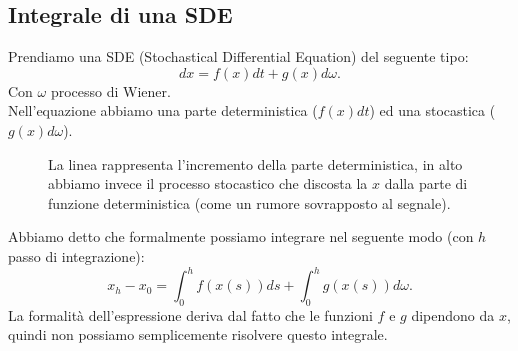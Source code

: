 \subsection{Integrale di una SDE}%
\label{sub:Integrale di una SDE}
Prendiamo una SDE (Stochastical Differential Equation) del seguente tipo:
\[
    dx = f(x) dt + g(x) d\omega
.\] 
Con $\omega$ processo di Wiener. \\
Nell'equazione abbiamo una parte deterministica ($f(x) dt$) ed una stocastica ($g(x)d\omega$).
\begin{figure}[H]
    \centering
    \caption{\scriptsize La linea rappresenta l'incremento della parte deterministica, in alto abbiamo invece il processo stocastico che discosta la $x$ dalla parte di funzione deterministica (come un rumore sovrapposto al segnale).}
    \label{fig:lez_7_int}
\end{figure}
\noindent
Abbiamo detto che formalmente possiamo integrare nel seguente modo (con $h$  passo di integrazione):
\[
    x_h - x_0 = \int_{0}^{h}  f(x(s) ) ds + \int_{0}^{h} g(x(s)) d\omega
.\] 
La formalità dell'espressione deriva dal fatto che le funzioni $f$ e $g$ dipendono da $x$, quindi non possiamo semplicemente risolvere questo integrale.
